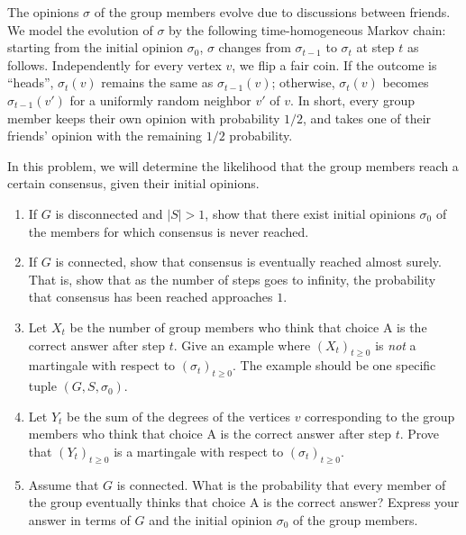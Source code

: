 \begin{enumerate}
The opinions $\sigma$ of the group members evolve due to discussions between friends.
We model the evolution of $\sigma$ by the following time-homogeneous Markov chain:
starting from the initial opinion $\sigma_0$, $\sigma$ changes from $\sigma_{t-1}$ to $\sigma_t$ at step $t$ as follows. Independently for every vertex $v$, we flip a fair coin. If the outcome is ``heads'', $\sigma_t(v)$ remains the same as $\sigma_{t-1}(v)$; otherwise, $\sigma_t(v)$ becomes $\sigma_{t-1}(v')$ for a uniformly random neighbor $v'$ of $v$.
In short, every group member keeps their own opinion with probability $1/2$, and takes one of their friends' opinion with the remaining $1/2$ probability.

In this problem, we will determine the likelihood that the group members reach a certain consensus, given their initial opinions.
\begin{enumerate}
\item {} If $G$ is disconnected and $|S| > 1$, show that there exist initial opinions $\sigma_0$ of the members for which consensus is never reached.
\item {} If $G$ is connected, show that consensus is eventually reached almost surely. That is, show that as the number of steps goes to infinity, the probability that consensus has been reached approaches $1$.

\item {} Let $X_t$ be the number of group members who think that choice A is the correct answer after step $t$. Give an example where $(X_t)_{t\geq 0}$ is \emph{not} a martingale with respect to $(\sigma_t)_{t \geq 0}$. 
The example should be one specific tuple $(G, S, \sigma_0)$.

\item {} Let $Y_t$ be the sum of the degrees of the vertices $v$ corresponding to the group members who think that choice A is the correct answer after step $t$. Prove that $(Y_t)_{t\geq 0}$ is a martingale with respect to $(\sigma_t)_{t \geq 0}$. 

\item {} Assume that $G$ is connected. What is the probability that every member of the group eventually thinks that choice A is the correct answer? Express your answer in terms of $G$ and the initial opinion $\sigma_0$ of the group members.


\end{enumerate}


\end{enumerate}
